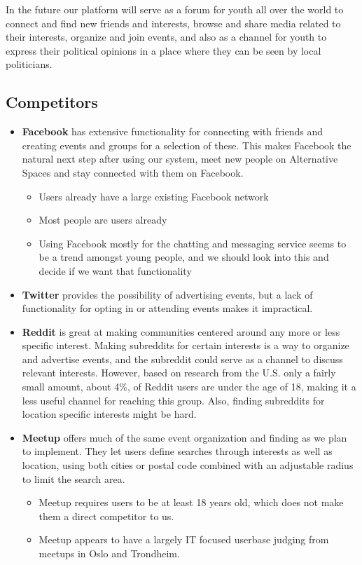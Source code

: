 In the future our platform will serve as a forum for youth all over the world to connect and find new friends and interests, browse and share media related to their interests, organize and join events, and also as a channel for youth to express their political opinions in a place where they can be seen by local politicians.

\subsection{Competitors}
\label{subsec:PrelimMarketCompetitors}

\begin{itemize}
  \item \textbf{Facebook} has extensive functionality for connecting with friends and creating events and groups for a selection of these. This makes Facebook the natural next step after using our system, meet new people on Alternative Spaces and stay connected with them on Facebook. \begin{itemize}
    \item Users already have a large existing Facebook network
    \item Most people are users already
    \item Using Facebook mostly for the chatting and messaging service seems to be a trend amongst young people, and we should look into this and decide if we want that functionality
  \end{itemize}
  \item \textbf{Twitter} provides the possibility of advertising events, but a lack of functionality for opting in or attending events makes it impractical.
  \item \textbf{Reddit}  is great at making communities centered around any more or less specific interest. Making subreddits for certain interests is a way to organize and advertise events, and the subreddit could serve as a channel to discuss relevant interests. However, based on research from the U.S. only a fairly small amount, about 4\%, of Reddit users are under the age of 18, making it a less useful channel for reaching this group. Also, finding subreddits for location specific interests might be hard.
  \item \textbf{Meetup} offers much of the same event organization and finding as we plan to implement. They let users define searches through interests as well as location, using both cities or postal code combined with an adjustable radius to limit the search area. \begin{itemize}
    \item Meetup requires users to be at least 18 years old, which does not make them a direct competitor to us.
    \item Meetup appears to have a largely IT focused userbase judging from meetups in Oslo and Trondheim.
  \end{itemize}
\end{itemize}

